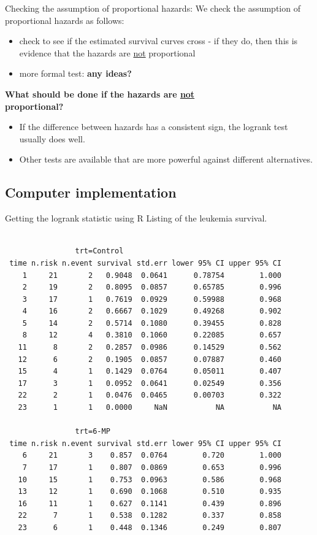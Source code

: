 \documentclass[envcountsect, 10pt, portrait, palatino]{beamer}
\begin{document}
\begin{frame}{Checking the assumption of proportional hazards:}
We check the assumption of proportional hazards as follows:
\begin{itemize}
\item check to see if the estimated survival curves cross - if they
do, then this is evidence that the hazards are \underline{not} proportional
\item more formal test: {\bf any ideas?}
\end{itemize}
{\bf What should be done if the hazards are \underline{not }\\
proportional?}

\begin{itemize}
\item If the difference between hazards has a consistent sign, the logrank
test usually does well.
\item Other tests are available that are more powerful against different
alternatives.
\end{itemize}
\end{frame}
\subsection{Computer implementation}
\begin{frame}[fragile]{Getting the logrank statistic using R}
Listing of the leukemia survival.

\scriptsize
\begin{verbatim}

                trt=Control
 time n.risk n.event survival std.err lower 95% CI upper 95% CI
    1     21       2   0.9048  0.0641      0.78754        1.000
    2     19       2   0.8095  0.0857      0.65785        0.996
    3     17       1   0.7619  0.0929      0.59988        0.968
    4     16       2   0.6667  0.1029      0.49268        0.902
    5     14       2   0.5714  0.1080      0.39455        0.828
    8     12       4   0.3810  0.1060      0.22085        0.657
   11      8       2   0.2857  0.0986      0.14529        0.562
   12      6       2   0.1905  0.0857      0.07887        0.460
   15      4       1   0.1429  0.0764      0.05011        0.407
   17      3       1   0.0952  0.0641      0.02549        0.356
   22      2       1   0.0476  0.0465      0.00703        0.322
   23      1       1   0.0000     NaN           NA           NA

                trt=6-MP
 time n.risk n.event survival std.err lower 95% CI upper 95% CI
    6     21       3    0.857  0.0764        0.720        1.000
    7     17       1    0.807  0.0869        0.653        0.996
   10     15       1    0.753  0.0963        0.586        0.968
   13     12       1    0.690  0.1068        0.510        0.935
   16     11       1    0.627  0.1141        0.439        0.896
   22      7       1    0.538  0.1282        0.337        0.858
   23      6       1    0.448  0.1346        0.249        0.807
\end{verbatim}
\end{frame}
\end{document}
